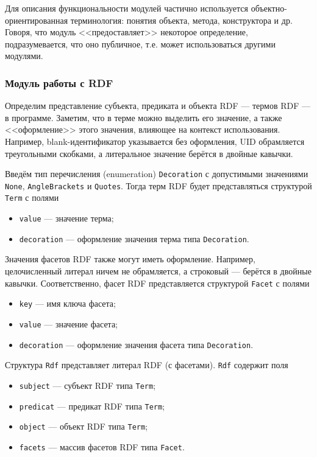 Для описания функциональности модулей частично используется объектно-ориентированная терминология:
понятия объекта, метода, конструктора и др. Говоря, что модуль <<предоставляет>> некоторое
определение, подразумевается, что оно публичное, т.е. может использоваться другими модулями.


\subsubsection{Модуль работы с RDF}

Определим представление субъекта, предиката и объекта RDF --- термов RDF --- в программе. Заметим,
что в терме можно выделить его значение, а также <<оформление>> этого значения, влияющее на
контекст использования. Например, blank-идентификатор указывается без оформления, UID обрамляется
треугольными скобками, а литеральное значение берётся в двойные кавычки.

Введём тип перечисления (enumeration) \texttt{Decoration} с допустимыми значениями \texttt{None},
\texttt{AngleBrackets} и \texttt{Quotes}. Тогда терм RDF будет представляться структурой
\texttt{Term} с полями
\begin{itemize}
    \item \texttt{value} --- значение терма;
    \item \texttt{decoration} --- оформление значения терма типа \texttt{Decoration}.
\end{itemize}

Значения фасетов RDF также могут иметь оформление. Например, целочисленный литерал ничем не
обрамляется, а строковый --- берётся в двойные кавычки. Соответственно, фасет RDF представляется
структурой \texttt{Facet} с полями
\begin{itemize}
    \item \texttt{key} --- имя ключа фасета;
    \item \texttt{value} --- значение фасета;
    \item \texttt{decoration} --- оформление значения фасета типа \texttt{Decoration}.
\end{itemize}

Структура \texttt{Rdf} представляет литерал RDF (с фасетами). \texttt{Rdf} содержит поля
\begin{itemize}
    \item \texttt{subject} --- субъект RDF типа \texttt{Term};
    \item \texttt{predicat} --- предикат RDF типа \texttt{Term};
    \item \texttt{object} --- объект RDF типа \texttt{Term};
    \item \texttt{facets} --- массив фасетов RDF типа \texttt{Facet}.
\end{itemize}

